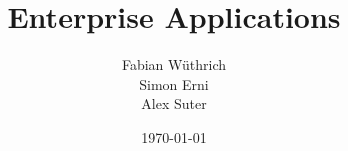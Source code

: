 \titlehead{Hochschule Luzern \\ 
	Technik \& Architektur}
\subject{Zusammenfassung}
\title{Enterprise Applications}
\subtitle{}
\author{Fabian Wüthrich \\ 
	Simon Erni \\
	Alex Suter}
\date{\today}

\maketitle